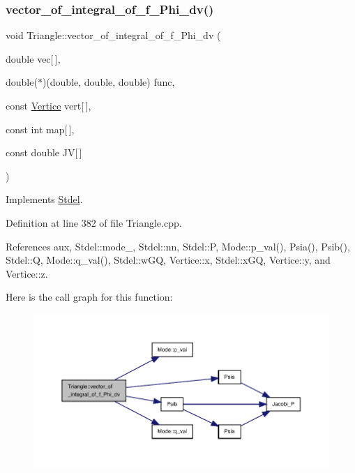 \subsubsection{\texorpdfstring{vector\+\_\+of\+\_\+integral\+\_\+of\+\_\+f\+\_\+\+Phi\+\_\+dv()}{vector\_of\_integral\_of\_f\_Phi\_dv()}\hspace{0.1cm}{\footnotesize\ttfamily [2/2]}}
{\footnotesize\ttfamily void Triangle\+::vector\+\_\+of\+\_\+integral\+\_\+of\+\_\+f\+\_\+\+Phi\+\_\+dv (\begin{DoxyParamCaption}\item[{double}]{vec\mbox{[}$\,$\mbox{]},  }\item[{double($\ast$)(double, double, double)}]{func,  }\item[{const \hyperlink{structVertice}{Vertice}}]{vert\mbox{[}$\,$\mbox{]},  }\item[{const int}]{map\mbox{[}$\,$\mbox{]},  }\item[{const double}]{JV\mbox{[}$\,$\mbox{]} }\end{DoxyParamCaption})\hspace{0.3cm}{\ttfamily [virtual]}}



Implements \hyperlink{classStdel_a3a22725f255ab04520ce1744eef8e2c0}{Stdel}.



Definition at line 382 of file Triangle.\+cpp.



References aux, Stdel\+::mode\+\_\+, Stdel\+::nn, Stdel\+::P, Mode\+::p\+\_\+val(), Psia(), Psib(), Stdel\+::Q, Mode\+::q\+\_\+val(), Stdel\+::w\+GQ, Vertice\+::x, Stdel\+::x\+GQ, Vertice\+::y, and Vertice\+::z.

Here is the call graph for this function\+:
\nopagebreak
\begin{figure}[H]
\begin{center}
\leavevmode
\includegraphics[width=350pt]{classTriangle_acc741aa9440446498e212d00cff284e8_cgraph}
\end{center}
\end{figure}
\mbox{\label{classStdel_a395c8d7d7890a9efdea23932fa22b420}} 

